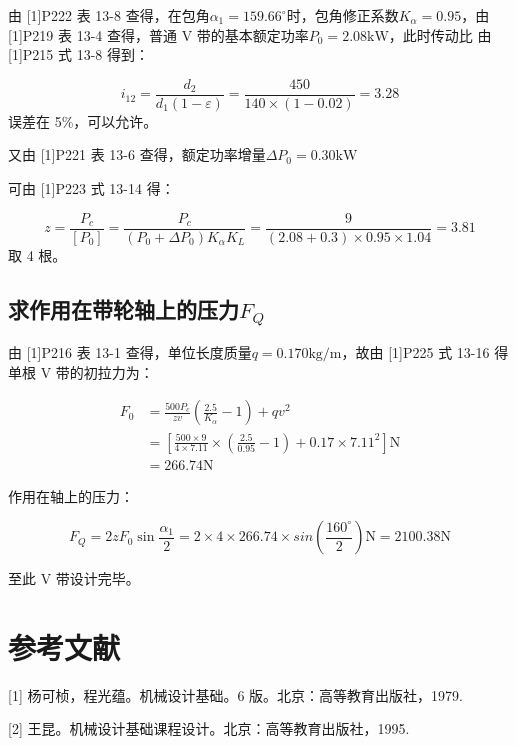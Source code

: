 \documentclass[12pt]{ctexart}
\begin{document}
由 [1]P222 表 13-8 查得，在包角$\alpha_1=159.66^\circ$时，包角修正系数$K_\alpha = 0.95$，由 [1]P219 表 13-4 查得，普通 V 带的基本额定功率$P_0 = 2.08\text{kW}$，此时传动比 由 [1]P215 式 13-8 得到：

$$i_{12}=\frac{d_2}{d_1(1-\varepsilon)}=\frac{450}{140\times (1-0.02)}=3.28$$误差在 5\%，可以允许。

又由 [1]P221 表 13-6 查得，额定功率增量$\Delta P_0=0.30\text{kW}$

可由 [1]P223 式 13-14 得：

$$z =\frac{P_c}{[P_0]} = \frac{P_c}{(P_0+\Delta P_0)K_\alpha K_L}=\frac{9}{(2.08+0.3)\times 0.95\times 1.04}=3.81$$取 4 根。

\subsection{求作用在带轮轴上的压力$F_Q$}

由 [1]P216 表 13-1 查得，单位长度质量$q=0.170\text{kg/m}$，故由 [1]P225 式 13-16 得单根 V 带的初拉力为：

\begin{align*}
    F_0 & = \frac{500P_c}{zv}\left(\frac{2.5}{K_\alpha}-1\right) + qv^2\\
    & = \left[\frac{500\times 9}{4\times 7.11}\times \left(\frac{2.5}{0.95}-1\right)+0.17\times 7.11^2\right]\text{N}\\
    & = 266.74\text{N}
\end{align*}

作用在轴上的压力：

$$F_Q = 2zF_0\sin \frac{\alpha_1}{2}=2\times 4\times 266.74\times sin(\frac{160^\circ}{2})\text{N}=2100.38\text{N}$$

至此 V 带设计完毕。

\newpage

\section{参考文献}

[1] 杨可桢，程光蕴。机械设计基础。6 版。北京：高等教育出版社，1979.

[2] 王昆。机械设计基础课程设计。北京：高等教育出版社，1995.
\end{document}
